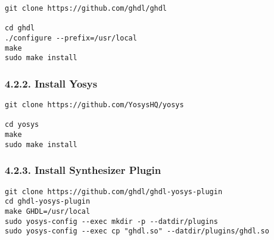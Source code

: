 \documentclass[]{article}
\begin{document}
\begin{verbatim}
git clone https://github.com/ghdl/ghdl

cd ghdl
./configure --prefix=/usr/local
make
sudo make install
\end{verbatim}

\subsubsection{4.2.2. Install Yosys}\label{install-yosys}

\begin{verbatim}
git clone https://github.com/YosysHQ/yosys

cd yosys
make
sudo make install
\end{verbatim}

\subsubsection{4.2.3. Install Synthesizer
Plugin}\label{install-synthesizer-plugin}

\begin{verbatim}
git clone https://github.com/ghdl/ghdl-yosys-plugin
cd ghdl-yosys-plugin
make GHDL=/usr/local
sudo yosys-config --exec mkdir -p --datdir/plugins
sudo yosys-config --exec cp "ghdl.so" --datdir/plugins/ghdl.so
\end{verbatim}
\end{document}
